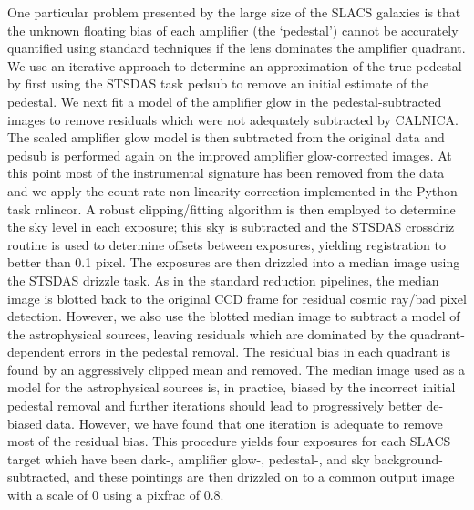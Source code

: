 \documentclass[iop]{emulateapj}
\begin{document}
One particular problem presented by the large size of the SLACS galaxies is that the unknown floating bias of each amplifier (the `pedestal') cannot be accurately quantified using standard techniques if the lens dominates the amplifier quadrant. We use an iterative approach to determine an approximation of the true pedestal by first using the STSDAS task {\sc pedsub} to remove an initial estimate of the pedestal. We next fit a model of the amplifier glow in the pedestal-subtracted images to remove residuals which were not adequately subtracted by CALNICA. The scaled amplifier glow model is then subtracted from the original data and {\sc pedsub} is performed again on the improved amplifier glow-corrected images. At this point most of the instrumental signature has been removed from the data and we apply the count-rate non-linearity correction implemented in the Python task {\sc rnlincor}. A robust clipping/fitting algorithm is then employed to determine the sky level in each exposure; this sky is subtracted and the STSDAS {\sc crossdriz} routine is used to determine offsets between exposures, yielding registration to better than 0.1 pixel. The exposures are then drizzled into a median image using the STSDAS {\sc drizzle} task. As in the standard reduction pipelines, the median image is blotted back to the original CCD frame for residual cosmic ray/bad pixel detection. However, we also use the blotted median image to subtract a model of the astrophysical sources, leaving residuals which are dominated by the quadrant-dependent errors in the pedestal removal. The residual bias in each quadrant is found by an aggressively clipped mean and removed. The median image used as a model for the astrophysical sources is, in practice, biased by the incorrect initial pedestal removal and further iterations should lead to progressively better de-biased data. However, we have found that one iteration is adequate to remove most of the residual bias. This procedure yields four exposures for each SLACS target which have been dark-, amplifier glow-, pedestal-, and sky background-subtracted, and these pointings are then drizzled on to a common output image with a scale of 0 using a pixfrac of 0.8.
\end{document}
